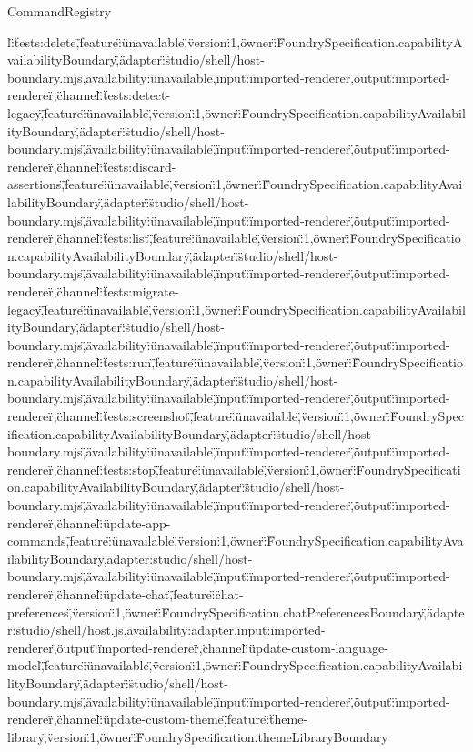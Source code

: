 \begin{lexlean}{CommandRegistry}
\begin{semanticmodule}
{l\":\"tests:delete\",\"feature\":\"unavailable\",\"version\":1,\"owner\":\"FoundrySpecification.capabilityAvailabilityBoundary\",\"adapter\":\"studio/shell/host-boundary.mjs\",\"availability\":\"unavailable\",\"input\":\"imported-renderer\",\"output\":\"imported-renderer\"},{\"channel\":\"tests:detect-legacy\",\"feature\":\"unavailable\",\"version\":1,\"owner\":\"FoundrySpecification.capabilityAvailabilityBoundary\",\"adapter\":\"studio/shell/host-boundary.mjs\",\"availability\":\"unavailable\",\"input\":\"imported-renderer\",\"output\":\"imported-renderer\"},{\"channel\":\"tests:discard-assertions\",\"feature\":\"unavailable\",\"version\":1,\"owner\":\"FoundrySpecification.capabilityAvailabilityBoundary\",\"adapter\":\"studio/shell/host-boundary.mjs\",\"availability\":\"unavailable\",\"input\":\"imported-renderer\",\"output\":\"imported-renderer\"},{\"channel\":\"tests:list\",\"feature\":\"unavailable\",\"version\":1,\"owner\":\"FoundrySpecification.capabilityAvailabilityBoundary\",\"adapter\":\"studio/shell/host-boundary.mjs\",\"availability\":\"unavailable\",\"input\":\"imported-renderer\",\"output\":\"imported-renderer\"},{\"channel\":\"tests:migrate-legacy\",\"feature\":\"unavailable\",\"version\":1,\"owner\":\"FoundrySpecification.capabilityAvailabilityBoundary\",\"adapter\":\"studio/shell/host-boundary.mjs\",\"availability\":\"unavailable\",\"input\":\"imported-renderer\",\"output\":\"imported-renderer\"},{\"channel\":\"tests:run\",\"feature\":\"unavailable\",\"version\":1,\"owner\":\"FoundrySpecification.capabilityAvailabilityBoundary\",\"adapter\":\"studio/shell/host-boundary.mjs\",\"availability\":\"unavailable\",\"input\":\"imported-renderer\",\"output\":\"imported-renderer\"},{\"channel\":\"tests:screenshot\",\"feature\":\"unavailable\",\"version\":1,\"owner\":\"FoundrySpecification.capabilityAvailabilityBoundary\",\"adapter\":\"studio/shell/host-boundary.mjs\",\"availability\":\"unavailable\",\"input\":\"imported-renderer\",\"output\":\"imported-renderer\"},{\"channel\":\"tests:stop\",\"feature\":\"unavailable\",\"version\":1,\"owner\":\"FoundrySpecification.capabilityAvailabilityBoundary\",\"adapter\":\"studio/shell/host-boundary.mjs\",\"availability\":\"unavailable\",\"input\":\"imported-renderer\",\"output\":\"imported-renderer\"},{\"channel\":\"update-app-commands\",\"feature\":\"unavailable\",\"version\":1,\"owner\":\"FoundrySpecification.capabilityAvailabilityBoundary\",\"adapter\":\"studio/shell/host-boundary.mjs\",\"availability\":\"unavailable\",\"input\":\"imported-renderer\",\"output\":\"imported-renderer\"},{\"channel\":\"update-chat\",\"feature\":\"chat-preferences\",\"version\":1,\"owner\":\"FoundrySpecification.chatPreferencesBoundary\",\"adapter\":\"studio/shell/host.js\",\"availability\":\"adapter\",\"input\":\"imported-renderer\",\"output\":\"imported-renderer\"},{\"channel\":\"update-custom-language-model\",\"feature\":\"unavailable\",\"version\":1,\"owner\":\"FoundrySpecification.capabilityAvailabilityBoundary\",\"adapter\":\"studio/shell/host-boundary.mjs\",\"availability\":\"unavailable\",\"input\":\"imported-renderer\",\"output\":\"imported-renderer\"},{\"channel\":\"update-custom-theme\",\"feature\":\"theme-library\",\"version\":1,\"owner\":\"FoundrySpecification.themeLibraryBoundary}
\end{semanticmodule}
\end{lexlean}
